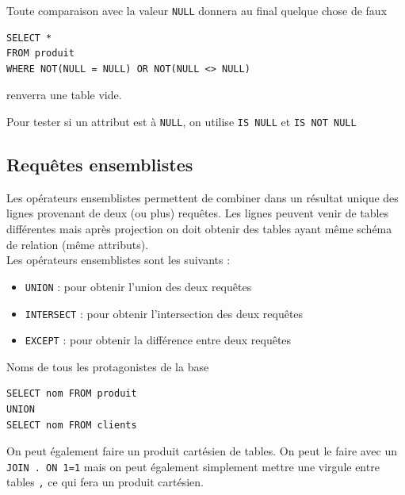 \begin{proposition}
	Toute comparaison avec la valeur \texttt{NULL} donnera au final quelque chose de faux
\end{proposition}

\begin{example}
	\begin{lstlisting}
SELECT *
FROM produit
WHERE NOT(NULL = NULL) OR NOT(NULL <> NULL)
	\end{lstlisting}
renverra une table vide.
\end{example}

\begin{syntaxe}
	Pour tester si un attribut est à \texttt{NULL}, on utilise \texttt{IS NULL} et \texttt{IS NOT NULL}
\end{syntaxe}

\subsection{Requêtes ensemblistes}

Les opérateurs ensemblistes permettent de combiner dans un résultat unique des lignes provenant de deux (ou plus) requêtes. Les lignes peuvent venir de tables différentes mais après projection on doit obtenir des tables ayant même schéma de relation (même attributs).\\

Les opérateurs ensemblistes sont les suivants : 
\begin{itemize}[label=$\bullet$]
	\item \texttt{UNION} : pour obtenir l'union des deux requêtes

	\item \texttt{INTERSECT} : pour obtenir l'intersection des deux requêtes

	\item \texttt{EXCEPT} : pour obtenir la différence entre deux requêtes
\end{itemize}

\begin{example}
    Noms de tous les protagonistes de la base
	\begin{lstlisting}
SELECT nom FROM produit
UNION
SELECT nom FROM clients
	\end{lstlisting}
\end{example}

\begin{syntaxe}
	On peut également faire un produit cartésien de tables. On peut le faire avec un \texttt{JOIN . ON 1=1} mais on peut également simplement mettre une virgule entre tables \texttt{,} ce qui fera un produit cartésien.
\end{syntaxe}

